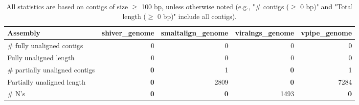 \documentclass[12pt,a4paper]{article}
\begin{document}
\begin{table}[ht]
\begin{center}
\caption{All statistics are based on contigs of size $\geq$ 100 bp, unless otherwise noted (e.g., "\# contigs ($\geq$ 0 bp)" and "Total length ($\geq$ 0 bp)" include all contigs).}
\begin{tabular}{|l*{4}{|r}|}
\hline
Assembly & shiver\_genome & smaltalign\_genome & viralngs\_genome & vpipe\_genome \\ \hline
\# fully unaligned contigs & 0 & 0 & 0 & 0 \\ \hline
Fully unaligned length & 0 & 0 & 0 & 0 \\ \hline
\# partially unaligned contigs & {\bf 0} & 1 & {\bf 0} & 1 \\ \hline
Partially unaligned length & {\bf 0} & 2809 & {\bf 0} & 7284 \\ \hline
\# N's & {\bf 0} & {\bf 0} & 1493 & {\bf 0} \\ \hline
\end{tabular}
\end{center}
\end{table}
\end{document}
